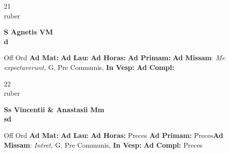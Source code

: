 \documentclass[10pt, openany]{book}
\begin{document}
    \begin{center}
        \begin{minipage}{3.5in}
            \vspace{2em}
            \begin{minipage}{0.5in}
                {\Huge 21} \\
                {\normalsize ruber}
            \end{minipage}
            \begin{minipage}{3.0in}
                \textbf{ \large S Agnetis VM \\
                \textnormal{\normalsize d}}

            \end{minipage}
            \begin{justify}Off Ord
                \textbf{Ad Mat: }
                \textbf{Ad Lau: }
                \textbf{Ad Horas: }
                \textbf{Ad Primam: }\textbf{Ad Missam}: \textit{Me expectaverunt,} G, Pre Communis, 
                \textbf{In Vesp: }
                \textbf{Ad Compl: }
            \end{justify}
        \end{minipage}
    \end{center}

    \begin{center}
        \begin{minipage}{3.5in}
            \vspace{2em}
            \begin{minipage}{0.5in}
                {\Huge 22} \\
                {\normalsize ruber}
            \end{minipage}
            \begin{minipage}{3.0in}
                \textbf{ \large Ss Vincentii \& Anastasii Mm \\
                \textnormal{\normalsize sd}}

            \end{minipage}
            \begin{justify}Off Ord
                \textbf{Ad Mat: }
                \textbf{Ad Lau: }
                \textbf{Ad Horas: }Preces
                \textbf{Ad Primam: }Preces\textbf{Ad Missam}: \textit{Intret,} G, Pre Communis, 
                \textbf{In Vesp: }
                \textbf{Ad Compl: }Preces
            \end{justify}
        \end{minipage}
    \end{center}
\end{document}
